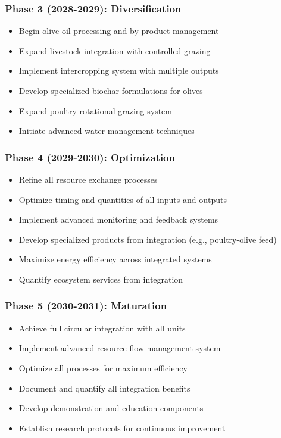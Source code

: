 \subsubsection{Phase 3 (2028-2029): Diversification}
\begin{itemize}
    \item Begin olive oil processing and by-product management
    \item Expand livestock integration with controlled grazing
    \item Implement intercropping system with multiple outputs
    \item Develop specialized biochar formulations for olives
    \item Expand poultry rotational grazing system
    \item Initiate advanced water management techniques
\end{itemize}

\subsubsection{Phase 4 (2029-2030): Optimization}
\begin{itemize}
    \item Refine all resource exchange processes
    \item Optimize timing and quantities of all inputs and outputs
    \item Implement advanced monitoring and feedback systems
    \item Develop specialized products from integration (e.g., poultry-olive feed)
    \item Maximize energy efficiency across integrated systems
    \item Quantify ecosystem services from integration
\end{itemize}

\subsubsection{Phase 5 (2030-2031): Maturation}
\begin{itemize}
    \item Achieve full circular integration with all units
    \item Implement advanced resource flow management system
    \item Optimize all processes for maximum efficiency
    \item Document and quantify all integration benefits
    \item Develop demonstration and education components
    \item Establish research protocols for continuous improvement
\end{itemize}

